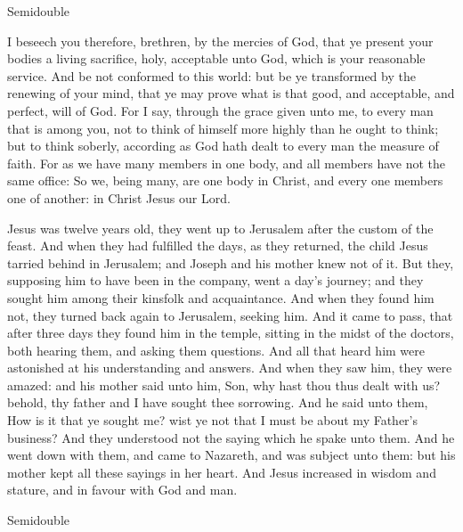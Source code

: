 \begin{inhead}
{Semidouble}
\end{inhead}

 I beseech you therefore, brethren, by the mercies of God, that ye present your bodies a living sacrifice, holy, acceptable unto God, which is your reasonable service. And be not conformed to this world: but be ye transformed by the renewing of your mind, that ye may prove what is that good, and acceptable, and perfect, will of God. For I say, through the grace given unto me, to every man that is among you, not to think of himself more highly than he ought to think; but to think soberly, according as God hath dealt to every man the measure of faith. For as we have many members in one body, and all members have not the same office: So we, being many, are one body in Christ, and every one members one of another: in Christ Jesus our Lord.

 Jesus was twelve years old, they went up to Jerusalem after the custom of the feast. And when they had fulfilled the days, as they returned, the child Jesus tarried behind in Jerusalem; and Joseph and his mother knew not of it. But they, supposing him to have been in the company, went a day's journey; and they sought him among their kinsfolk and acquaintance. And when they found him not, they turned back again to Jerusalem, seeking him. And it came to pass, that after three days they found him in the temple, sitting in the midst of the doctors, both hearing them, and asking them questions. And all that heard him were astonished at his understanding and answers. And when they saw him, they were amazed: and his mother said unto him, Son, why hast thou thus dealt with us? behold, thy father and I have sought thee sorrowing. And he said unto them, How is it that ye sought me? wist ye not that I must be about my Father's business? And they understood not the saying which he spake unto them. And he went down with them, and came to Nazareth, and was subject unto them: but his mother kept all these sayings in her heart. And Jesus increased in wisdom and stature, and in favour with God and man.


\label{EpiphanyII}
\begin{inhead}
{Semidouble}
\end{inhead}


